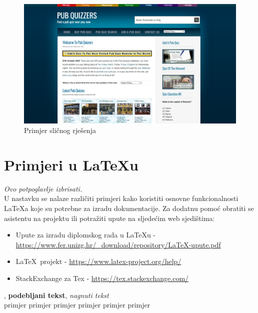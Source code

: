		\begin{figure}[H]
			\includegraphics[width=\textwidth]{slike/slicnoRjesenje.PNG} 
			\caption{Primjer sličnog rješenja}
			\label{fig:slicnoRjesenje}
		\end{figure}

		\section{Primjeri u \LaTeX u}
		
		\textit{Ovo potpoglavlje izbrisati.}\\

		U nastavku se nalaze različiti primjeri kako koristiti osnovne funkcionalnosti \LaTeX a koje su potrebne za izradu dokumentacije. Za dodatnu pomoć obratiti se asistentu na projektu ili potražiti upute na sljedećim web sjedištima:
		\begin{itemize}
			\item Upute za izradu diplomskog rada u \LaTeX u - \url{https://www.fer.unizg.hr/_download/repository/LaTeX-upute.pdf}
			\item \LaTeX\ projekt - \url{https://www.latex-project.org/help/}
			\item StackExchange za Tex - \url{https://tex.stackexchange.com/}\\
		
		\end{itemize} 	


		
		\noindent {}, \textbf{podebljani tekst}, 	\textit{nagnuti tekst}\\
		\noindent \normalsize primjer \large primjer \Large primjer \LARGE {primjer} \huge {primjer} \Huge primjer \normalsize
				
